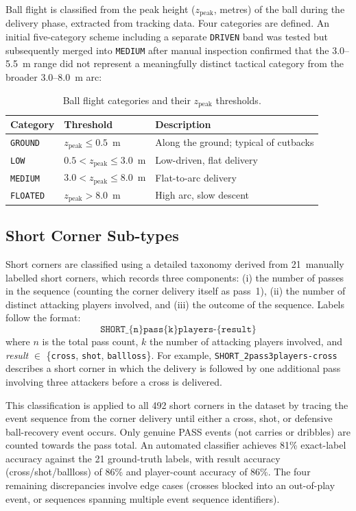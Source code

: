 Ball flight is classified from the peak height ($z_\mathrm{peak}$, metres) of
the ball during the delivery phase, extracted from tracking data. Four categories
are defined. An initial five-category scheme including a separate
\texttt{DRIVEN} band was tested but subsequently merged into \texttt{MEDIUM}
after manual inspection confirmed that the 3.0–5.5~m range did not represent a
meaningfully distinct tactical category from the broader 3.0–8.0~m arc:

\begin{table}[h]
  \centering
  \caption{Ball flight categories and their $z_\mathrm{peak}$ thresholds.}
  \label{tab:flight}
  \begin{tabular}{lll}
    \toprule
    \textbf{Category} & \textbf{Threshold} & \textbf{Description} \\
    \midrule
    \texttt{GROUND}  & $z_\mathrm{peak} \leq 0.5$~m & Along the ground; typical of cutbacks \\
    \texttt{LOW}     & $0.5 < z_\mathrm{peak} \leq 3.0$~m & Low-driven, flat delivery \\
    \texttt{MEDIUM}  & $3.0 < z_\mathrm{peak} \leq 8.0$~m & Flat-to-arc delivery \\
    \texttt{FLOATED} & $z_\mathrm{peak} > 8.0$~m & High arc, slow descent \\
    \bottomrule
  \end{tabular}
\end{table}

\subsection{Short Corner Sub-types}
\label{sec:sq2_short}

Short corners are classified using a detailed taxonomy derived from 21~manually
labelled short corners, which records three components: (i) the number of passes
in the sequence (counting the corner delivery itself as pass~1), (ii) the number
of distinct attacking players involved, and (iii) the outcome of the sequence.
Labels follow the format:
\[
  \texttt{SHORT\_\{n\}pass\{k\}players-\{result\}}
\]
where $n$ is the total pass count, $k$ the number of attacking players involved,
and \textit{result} $\in$ \{\texttt{cross}, \texttt{shot}, \texttt{ballloss}\}.
For example, \texttt{SHORT\_2pass3players-cross} describes a short corner in
which the delivery is followed by one additional pass involving three attackers
before a cross is delivered.

This classification is applied to all 492 short corners in the dataset by
tracing the event sequence from the corner delivery until either a cross, shot,
or defensive ball-recovery event occurs. Only genuine PASS events (not carries
or dribbles) are counted towards the pass total. An automated classifier
achieves 81\% exact-label accuracy against the 21 ground-truth labels, with
result accuracy (cross/shot/ballloss) of 86\% and player-count accuracy of 86\%.
The four remaining discrepancies involve edge cases (crosses blocked into an
out-of-play event, or sequences spanning multiple event sequence identifiers).


